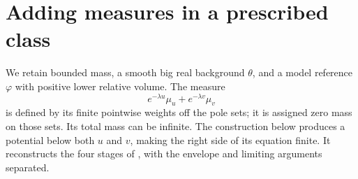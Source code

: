 \section{Adding measures in a prescribed class}
\label{sec:big-weighted-addition}

We retain bounded mass, a smooth big real background $\theta$, and a model reference $\varphi$ with positive lower relative volume. The measure
\[
 e^{-\lambda u}\mu_u+e^{-\lambda v}\mu_v
\]
is defined by its finite pointwise weights off the pole sets; it is assigned zero mass on those sets. Its total mass can be infinite. The construction below produces a potential below both $u$ and $v$, making the right side of its equation finite. It reconstructs the four stages of \cite[Proposition 6.1]{XL26}, with the envelope and limiting arguments separated.

